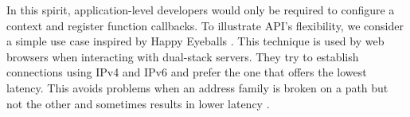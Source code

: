 In this spirit, application-level developers would only be required to
configure a \texttt{\tcpls} context and register function callbacks.
To illustrate \tcpls API's flexibility, we consider a simple
use case inspired by Happy Eyeballs \cite{rfc8305}. This technique is
used by web browsers when interacting with dual-stack servers. They
try to establish \tcp connections using IPv4 and IPv6 and prefer the
one that offers the lowest latency. This avoids problems when an address
family is broken on a path but not the other and sometimes results in
lower latency \cite{bajpai2019longitudinal}.


